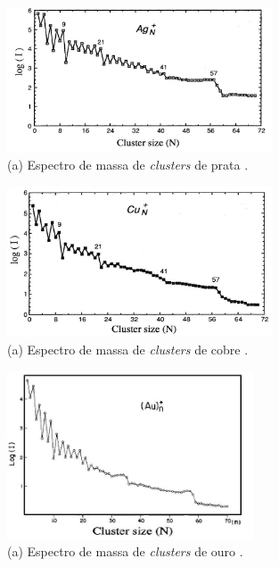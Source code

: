 \begin{figure}
  \centering
  \includegraphics[width=0.7\textwidth]{images/clusters/espec_ag}
  \caption{(a) Espectro de massa de \textit{clusters} de prata \cite{Heer}.  }
  \label{fig:espec_ag}
\end{figure}

\begin{figure}
  \centering
  \includegraphics[width=0.7\textwidth]{images/clusters/espec_cu}
  \caption{(a) Espectro de massa de \textit{clusters} de cobre \cite{Heer}.  }
  \label{fig:espec_cu}
\end{figure}

\begin{figure}
  \centering
  \includegraphics[width=0.65\textwidth]{images/clusters/espec_au}
  \caption{(a) Espectro de massa de \textit{clusters} de ouro \cite{KATAKUSE1985229}.  }
  \label{fig:espec_au}
\end{figure}




